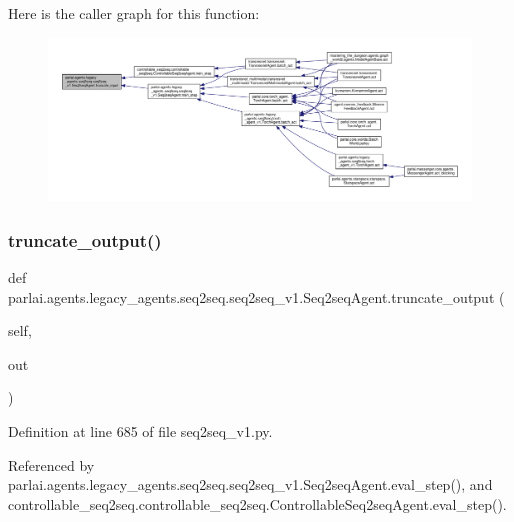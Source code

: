 Here is the caller graph for this function\+:
\nopagebreak
\begin{figure}[H]
\begin{center}
\leavevmode
\includegraphics[width=350pt]{classparlai_1_1agents_1_1legacy__agents_1_1seq2seq_1_1seq2seq__v1_1_1Seq2seqAgent_ae4496420685c3cd273920f89b4e82625_icgraph}
\end{center}
\end{figure}
\mbox{\label{classparlai_1_1agents_1_1legacy__agents_1_1seq2seq_1_1seq2seq__v1_1_1Seq2seqAgent_a4567d7a200e20bd09235d4833424bdad}} 
\subsubsection{\texorpdfstring{truncate\+\_\+output()}{truncate\_output()}}
{\footnotesize\ttfamily def parlai.\+agents.\+legacy\+\_\+agents.\+seq2seq.\+seq2seq\+\_\+v1.\+Seq2seq\+Agent.\+truncate\+\_\+output (\begin{DoxyParamCaption}\item[{}]{self,  }\item[{}]{out }\end{DoxyParamCaption})}



Definition at line 685 of file seq2seq\+\_\+v1.\+py.



Referenced by parlai.\+agents.\+legacy\+\_\+agents.\+seq2seq.\+seq2seq\+\_\+v1.\+Seq2seq\+Agent.\+eval\+\_\+step(), and controllable\+\_\+seq2seq.\+controllable\+\_\+seq2seq.\+Controllable\+Seq2seq\+Agent.\+eval\+\_\+step().

